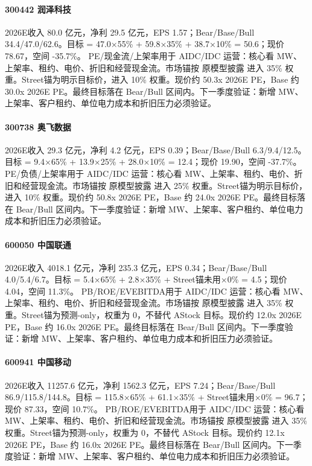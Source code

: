 \paragraph{300442 润泽科技} 2026E收入 80.0 亿元，净利 29.5 亿元，EPS 1.57；Bear/Base/Bull 34.4/47.0/62.6。目标 = 47.0×55\% + 59.8×35\% + 38.7×10\% = 50.6；现价 78.67，空间 -35.7\%。 PE/现金流/上架率用于 AIDC/IDC 运营：核心看 MW、上架率、租约、电价、折旧和经营现金流。市场锚按 原模型披露 进入 35\% 权重。Street锚为明示目标价，进入 10\% 权重。现价约 50.3x 2026E PE，Base 约 30.0x 2026E PE。最终目标落在 Bear/Bull 区间内。下一季度验证：新增 MW、上架率、客户租约、单位电力成本和折旧压力必须验证。
\paragraph{300738 奥飞数据} 2026E收入 29.3 亿元，净利 4.2 亿元，EPS 0.39；Bear/Base/Bull 6.3/9.4/12.5。目标 = 9.4×65\% + 13.9×25\% + 28.0×10\% = 12.4；现价 19.90，空间 -37.7\%。 PE/负债/上架率用于 AIDC/IDC 运营：核心看 MW、上架率、租约、电价、折旧和经营现金流。市场锚按 原模型披露 进入 25\% 权重。Street锚为明示目标价，进入 10\% 权重。现价约 50.8x 2026E PE，Base 约 24.0x 2026E PE。最终目标落在 Bear/Bull 区间内。下一季度验证：新增 MW、上架率、客户租约、单位电力成本和折旧压力必须验证。
\paragraph{600050 中国联通} 2026E收入 4018.1 亿元，净利 235.3 亿元，EPS 0.34；Bear/Base/Bull 4.0/5.4/6.7。目标 = 5.4×65\% + 2.8×35\% + Street锚未用×0\% = 4.5；现价 4.04，空间 11.3\%。 PB/ROE/EVEBITDA用于 AIDC/IDC 运营：核心看 MW、上架率、租约、电价、折旧和经营现金流。市场锚按 原模型披露 进入 35\% 权重。Street锚为预测-only，权重为 0，不替代 AStock 目标。现价约 12.0x 2026E PE，Base 约 16.0x 2026E PE。最终目标落在 Bear/Bull 区间内。下一季度验证：新增 MW、上架率、客户租约、单位电力成本和折旧压力必须验证。
\paragraph{600941 中国移动} 2026E收入 11257.6 亿元，净利 1562.3 亿元，EPS 7.24；Bear/Base/Bull 86.9/115.8/144.8。目标 = 115.8×65\% + 61.1×35\% + Street锚未用×0\% = 96.7；现价 87.33，空间 10.7\%。 PB/ROE/EVEBITDA用于 AIDC/IDC 运营：核心看 MW、上架率、租约、电价、折旧和经营现金流。市场锚按 原模型披露 进入 35\% 权重。Street锚为预测-only，权重为 0，不替代 AStock 目标。现价约 12.1x 2026E PE，Base 约 16.0x 2026E PE。最终目标落在 Bear/Bull 区间内。下一季度验证：新增 MW、上架率、客户租约、单位电力成本和折旧压力必须验证。
